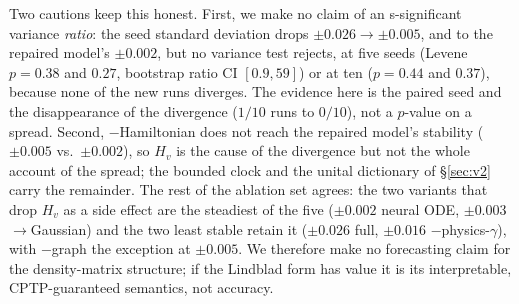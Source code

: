 \documentclass[journal]{IEEEtran}
\begin{document}
Two cautions keep this honest. First, we make no claim of an s-significant variance
\emph{ratio}: the seed standard deviation drops $\pm0.026 \to \pm0.005$, and to the
repaired model's $\pm0.002$, but no variance test rejects, at five seeds (Levene
$p = 0.38$ and $0.27$, bootstrap ratio CI $[0.9, 59]$) or at ten ($p = 0.44$ and
$0.37$), because none of the new runs diverges. The evidence here is the paired seed
and the disappearance of the divergence ($1/10$ runs to $0/10$), not a $p$-value on
a spread. Second, $-$Hamiltonian
does not reach the repaired model's stability ($\pm0.005$ vs.\ $\pm0.002$), so $H_v$
is the cause of the divergence but not the whole account of the spread; the bounded
clock and the unital dictionary of \S\ref{sec:v2} carry the remainder. The rest of
the ablation set agrees: the two variants that drop $H_v$ as a side effect are the
steadiest of the five ($\pm0.002$ neural ODE, $\pm0.003$ ${\to}$Gaussian) and the two
least stable retain it ($\pm0.026$ full, $\pm0.016$ $-$physics-$\gamma$), with
$-$graph the exception at $\pm0.005$.
We therefore make no forecasting claim for the density-matrix structure; if the
Lindblad form has value it is its interpretable, CPTP-guaranteed semantics, not
accuracy.
\end{document}
